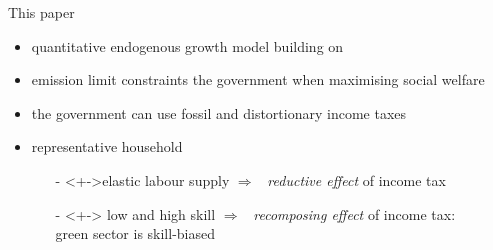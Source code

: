 \documentclass[11pt,aspectratio=169]{beamer}
\newcommand{\ar}{$\Rightarrow$ \ }
\begin{document}
\begin{frame}{This paper}
	\begin{itemize}
		\item<+-> quantitative \alert{endogenous growth} model building on \cite{Fried2018ClimateAnalysis}
		\vspace{3mm}
		\item<+->  \alert{emission limit constraints} the government when  {maximising social welfare}
		\vspace{3mm}
		\item<+-> the government can use \alert{fossil} and \alert{distortionary income taxes}
		\vspace{3mm}
		\item<+->  \alert{representative} household  
		\vspace{2mm}
		\begin{itemize}
			\item[-]<+->\alert{elastic} labour supply \ar \textit{reductive effect} of income tax
			\vspace{2mm}
			\item[-]<+->  \alert{low and high skill} \ar \textit{recomposing effect} of income tax:\\ \hspace{32mm} green sector is skill-biased  \small{\citep{Consoli2016DoCapital}}
		\end{itemize}
		
	\end{itemize}
\end{frame}
\end{document}
